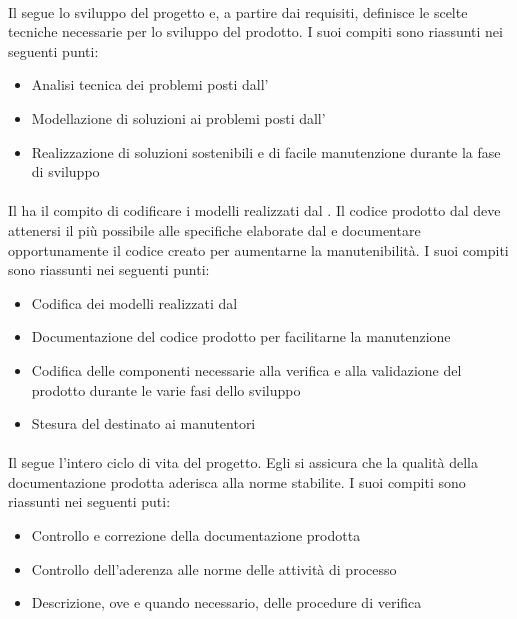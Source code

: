 \paragraph{\prog{}}
Il \prog{} segue lo sviluppo del progetto e, a partire dai requisiti, definisce le scelte tecniche necessarie per lo sviluppo del prodotto. 
I suoi compiti sono riassunti nei seguenti punti:
\begin{itemize}
\item Analisi tecnica dei problemi posti dall' \ana{}
\item Modellazione di soluzioni ai problemi posti dall' \ana{}
\item Realizzazione di soluzioni sostenibili e di facile manutenzione durante la fase di sviluppo
\end{itemize}

\paragraph{\progr{}}
Il \progr{} ha il compito di codificare i modelli realizzati dal \prog{}. Il codice prodotto dal \progr{} deve attenersi il più possibile alle specifiche elaborate dal \prog{} e documentare opportunamente il codice creato per aumentarne la manutenibilità.
I suoi compiti sono riassunti nei seguenti punti:
\begin{itemize}
\item Codifica dei modelli realizzati dal \prog{}
\item Documentazione del codice prodotto per facilitarne la manutenzione
\item Codifica delle componenti necessarie alla verifica e alla validazione del prodotto durante le varie fasi dello sviluppo
\item Stesura del \MU{} destinato ai manutentori
\end{itemize}

\paragraph{\ver{}}
Il \ver{} segue l'intero ciclo di vita del progetto. Egli si assicura che la qualità della documentazione prodotta aderisca alla norme stabilite.
I suoi compiti sono riassunti nei seguenti puti:
\begin{itemize}
\item Controllo e correzione della documentazione prodotta
\item Controllo dell'aderenza alle norme delle attività di processo
\item Descrizione, ove e quando necessario, delle procedure di verifica
\end{itemize}


